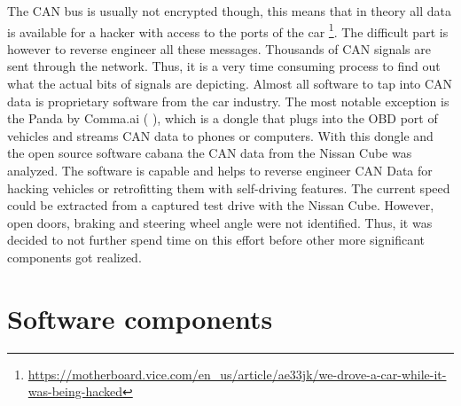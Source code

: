 The CAN bus is usually not encrypted though, this means that in theory all data is available for a hacker with access to the ports of the car \footnote{\url{https://motherboard.vice.com/en_us/article/ae33jk/we-drove-a-car-while-it-was-being-hacked}}. The difficult part is however to reverse engineer all these messages. Thousands of CAN signals are sent through the network. Thus, it is a very time consuming process to find out what the actual bits of signals are depicting.  Almost all software to tap into CAN data is proprietary software from the car industry. The most notable exception is the Panda by Comma.ai ( \emph{}), which is a dongle that plugs into the OBD port of vehicles and streams CAN data to phones or computers. With this dongle and the open source software cabana the CAN data from the Nissan Cube was analyzed. The software is capable and helps to reverse engineer CAN Data for hacking vehicles or retrofitting them with self-driving features. The current speed could be extracted from a captured test drive with the Nissan Cube. However, open doors, braking and steering wheel angle were not identified. Thus, it was decided to not further spend time on this effort before other more significant components got realized. 

\section {Software components}

